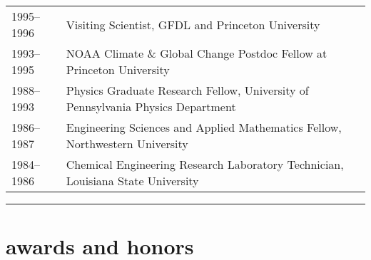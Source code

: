 \documentclass{article}
\begin{document}
\begin{tabular}{ll}
  1995--1996     &  Visiting Scientist, GFDL and Princeton University  \\ 
  
  1993--1995     & NOAA Climate \& Global Change Postdoc Fellow at Princeton University \\
  
  1988--1993     &  Physics Graduate Research Fellow, University of Pennsylvania Physics Department  \\                     
  
  1986--1987     &  Engineering Sciences and Applied Mathematics Fellow, Northwestern University \\
  
  1984--1986     &  Chemical Engineering Research Laboratory Technician, Louisiana State University

\end{tabular}


\noindent\rule{\textwidth}{1pt}
\vspace{-.5cm}
\section*{\sc  \color{Maroon}   awards and honors}
\vspace{-.25cm}
\end{document}
